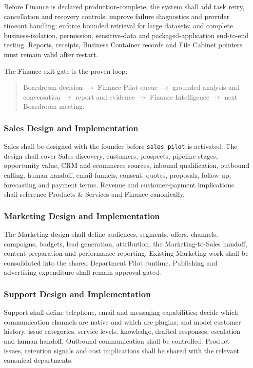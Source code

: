 Before Finance is declared production-complete, the system shall add task retry,
cancellation and recovery controls; improve failure diagnostics and provider timeout
handling; enforce bounded retrieval for large datasets; and complete business-isolation,
permission, sensitive-data and packaged-application end-to-end testing.  Reports, receipts,
Business Container records and File Cabinet pointers must remain valid after restart.

The Finance exit gate is the proven loop:

\begin{quote}
Boardroom decision $\rightarrow$ Finance Pilot queue $\rightarrow$ grounded analysis and
conversation $\rightarrow$ report and evidence $\rightarrow$ Finance Intelligence
$\rightarrow$ next Boardroom meeting.
\end{quote}

\subsubsection{Sales Design and Implementation}

Sales shall be designed with the founder before \texttt{sales\_pilot} is activated.  The
design shall cover Sales discovery, customers, prospects, pipeline stages, opportunity value,
CRM and ecommerce sources, inbound qualification, outbound calling, human handoff, email
funnels, consent, quotes, proposals, follow-up, forecasting and payment terms.  Revenue and
customer-payment implications shall reference Products \& Services and Finance canonically.

\subsubsection{Marketing Design and Implementation}

The Marketing design shall define audiences, segments, offers, channels, campaigns, budgets,
lead generation, attribution, the Marketing-to-Sales handoff, content preparation and
performance reporting.  Existing Marketing work shall be consolidated into the shared
Department Pilot runtime.  Publishing and advertising expenditure shall remain approval-gated.

\subsubsection{Support Design and Implementation}

Support shall define telephone, email and messaging capabilities; decide which communication
channels are native and which are plugins; and model customer history, issue categories,
service levels, knowledge, drafted responses, escalation and human handoff.  Outbound
communication shall be controlled.  Product issues, retention signals and cost implications
shall be shared with the relevant canonical departments.

